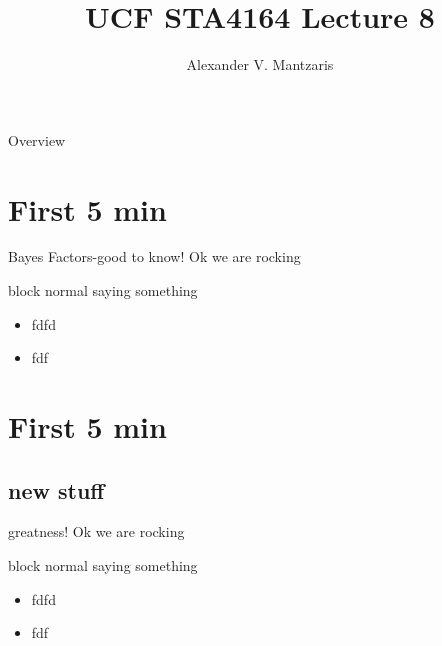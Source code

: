 \documentclass{beamer}
\title[Lect 8]{UCF STA4164 Lecture 8}
\author{Alexander V. Mantzaris}
\date{\vspace{-8cm}}
\begin{document}
\begin{frame}
  \titlepage
\end{frame}

\begin{frame}{Overview}
\tableofcontents
\end{frame}

\section{First 5 min}

\begin{frame}{Bayes Factors-good to know!} 
  Ok we are rocking
  \begin{block}{block normal}
    saying something
    \begin{itemize}
    \item fdfd
    \item fdf
    \end{itemize}
  \end{block}
  
\end{frame}


\section{First 5 min}
\subsection{new stuff}
\begin{frame}{greatness!} 
  Ok we are rocking
  \begin{block}{block normal}
    saying something
    \begin{itemize}
    \item fdfd
    \item fdf
    \end{itemize}
  \end{block}
  
\end{frame}
\end{document}
